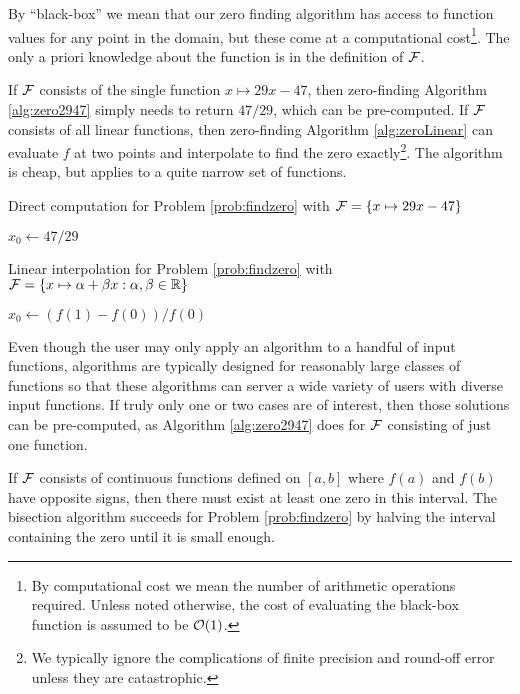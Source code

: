 By ``black-box'' we mean that our zero finding algorithm has access to function values for any point in the domain, but these come at a computational cost\footnote{By computational cost we mean the number of arithmetic operations required.  Unless noted otherwise, the cost of evaluating the black-box function is assumed to be $\operatorname{{\mathcal O}}(1)$.}. The only a priori knowledge about the function is in the definition of $\mathcal{F}$.

If $\mathcal{F}$ consists of the single function $x \mapsto 29x - 47$, then zero-finding Algorithm \ref{alg:zero2947} simply needs to return $47/29$, which can be pre-computed.  If $\mathcal{F}$ consists of all linear functions, then zero-finding Algorithm \ref{alg:zeroLinear} can evaluate $f$ at two points and interpolate to find the zero exactly\footnote{We typically ignore the complications of finite precision and round-off error unless they are catastrophic.}.  The algorithm is cheap, but applies to a quite narrow set of functions.  

\begin{algorithm}[H]
\caption{Direct computation for Problem \ref{prob:findzero} with $\mathcal{F} = \{x \mapsto 29x - 47 \}$ \label{alg:zero2947}}
	\begin{algorithmic}
    \RETURN $x_0 \leftarrow 47/29$
    \end{algorithmic}
\end{algorithm}

\begin{algorithm}[H]
\caption{Linear interpolation for Problem \ref{prob:findzero} with $\mathcal{F} = \{x \mapsto \alpha  + \beta x : \alpha, \beta \in \mathbb{R}\}$ \label{alg:zeroLinear}}
	\begin{algorithmic}
    \RETURN $x_0 \leftarrow (f(1) - f(0))/f(0)$
    \end{algorithmic}
\end{algorithm}

Even though the user may only apply an algorithm to a handful of input functions, algorithms are typically designed for reasonably large classes of functions so that these algorithms can server a wide variety of users with diverse input functions.  If truly only one or two cases are of interest, then those solutions can be pre-computed, as Algorithm \ref{alg:zero2947} does for $\mathcal{F}$ consisting of just one function.

If $\mathcal{F}$ consists of continuous functions defined on $[a,b]$ where $f(a)$ and $f(b)$ have opposite signs, then there must exist at least one zero in this interval.  The bisection algorithm succeeds for Problem \ref{prob:findzero} by halving the interval containing the zero until it is small enough.

